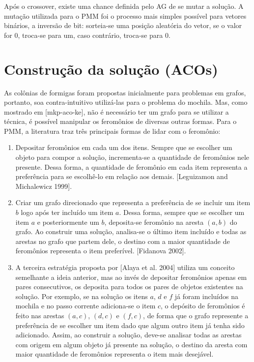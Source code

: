 Após o crossover, existe uma chance definida pelo AG de se mutar a solução. A mutação utilizada para o PMM foi o processo mais simples possível para vetores binários, a inversão de bit: sorteia-se uma posição aleatória do vetor, se o valor for 0, troca-se para um, caso contrário, troca-se para 0.

\section{Construção da solução (ACOs)}
As colônias de formigas foram propostas inicialmente para problemas em grafos, portanto, soa contra-intuitivo utilizá-las para o problema do mochila. Mas, como mostrado em [mkp-aco-ke], não é necessário ter um grafo para se utilizar a técnica, é possível manipular os feromônios de diversas outras formas. Para o PMM, a literatura traz três principais formas de lidar com o feromônio:

\begin{enumerate} 
	\item Depositar feromônios em cada um dos itens. Sempre que se escolher um objeto para compor a solução, incrementa-se a quantidade de feromônios nele presente. Dessa forma, a quantidade de feromônio em cada item representa a preferência para se escolhê-lo em relação aos demais. [Leguizamon and Michalewicz 1999].
	\item Criar um grafo direcionado que representa a preferência de se incluir um item $b$ logo após ter incluído um item $a$. Dessa forma, sempre que se escolher um item $a$ e posteriormente um $b$, deposita-se feromônio na aresta $(a,b)$ do grafo. Ao construir uma solução, analisa-se o último item incluído e todas as arestas no grafo que partem dele, o destino com a maior quantidade de feromônios representa o item preferível. [Fidanova 2002].
	\item A terceira estratégia proposta por [Alaya et al. 2004] utiliza um conceito semelhante a ideia anterior, mas ao invés de depositar feromônios apenas em pares consecutivos, os deposita para todos os pares de objetos existentes na solução. Por exemplo, se na solução os itens $a$, $d$ e $f$ já foram incluídos na mochila e no passo corrente adiciona-se o item $c$, o depósito de feromônios é feito nas arestas $(a,c)$, $(d,c)$ e $(f,c)$, de forma que o grafo represente a preferência de se escolher um item dado que algum outro item já tenha sido adicionado. Assim, ao construir a solução, deve-se analisar todas as arestas com origem em algum objeto já presente na solução, o destino da aresta com maior quantidade de feromônios representa o item mais desejável.
\end{enumerate}

